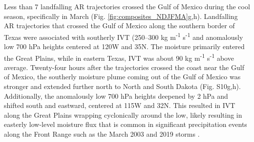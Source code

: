 \documentclass[draft]{agujournal2019}
\begin{document}
Less than 7 landfalling AR trajectories crossed the Gulf of Mexico during the cool season, specifically in March (Fig. \ref{fig:composites_NDJFMA}g,h). Landfalling AR trajectories that crossed the Gulf of Mexico along the southern border of Texas were associated with southerly IVT (250--300 kg m\textsuperscript{-1} s\textsuperscript{-1} and anomalously low 700 hPa heights centered at 120\textdegree W and 35\textdegree N. The moisture primarily entered the Great Plains, while in eastern Texas, IVT was about 90 kg m\textsuperscript{-1} s\textsuperscript{-1} above average. Twenty-four hours after the trajectories crossed the coast near the Gulf of Mexico, the southerly moisture plume coming out of the Gulf of Mexico was stronger and extended further north to North and South Dakota (Fig. S10g,h). Additionally, the anomalously low 700 hPa heights deepened by 2 hPa and shifted south and eastward, centered at 115\textdegree W and 32\textdegree N. This resulted in IVT along the Great Plains wrapping cyclonically around the low, likely resulting in easterly low-level moisture flux that is common in significant precipitation events along the Front Range such as the March 2003 and 2019 storms \cite{Wesley2013Extreme2003, Zou2025A2019}.

\end{document}
